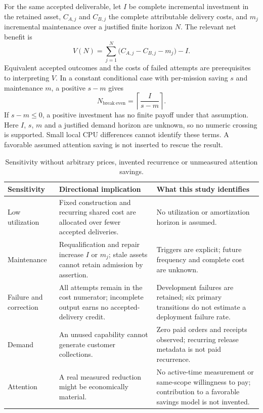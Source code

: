 \documentclass[11pt,a4paper]{article}
\begin{document}
For the same accepted deliverable, let $I$ be complete incremental investment in the retained asset, $C_{A,j}$ and $C_{B,j}$ the complete attributable delivery costs, and $m_j$ incremental maintenance over a justified finite horizon $N$. The relevant net benefit is
\begin{equation}
V(N)=\sum_{j=1}^{N}\bigl(C_{A,j}-C_{B,j}-m_j\bigr)-I.
\label{eq:payback}
\end{equation}
Equivalent accepted outcomes and the costs of failed attempts are prerequisites to interpreting $V$. In a constant conditional case with per-mission saving $s$ and maintenance $m$, a positive $s-m$ gives
\begin{equation}
N_{\mathrm{break\ even}}=\left\lceil\frac{I}{s-m}\right\rceil.
\end{equation}
If $s-m\leq0$, a positive investment has no finite payoff under that assumption. Here $I$, $s$, $m$ and a justified demand horizon are unknown, so no numeric crossing is supported. Small local CPU differences cannot identify these terms. A favorable assumed attention saving is not inserted to rescue the result.\cite{economics}

\begin{table}[htbp]
\centering\small
\begin{tabularx}{\textwidth}{@{}p{}YY@{}}
\toprule
Sensitivity & Directional implication & What this study identifies \\
\midrule
Low utilization & Fixed construction and recurring shared cost are allocated over fewer accepted deliveries. & No utilization or amortization horizon is assumed. \\
Maintenance & Requalification and repair increase $I$ or $m_j$; stale assets cannot retain admission by assertion. & Triggers are explicit; future frequency and complete cost are unknown. \\
Failure and correction & All attempts remain in the cost numerator; incomplete output earns no accepted-delivery credit. & Development failures are retained; six primary transitions do not estimate a deployment failure rate. \\
Demand & An unused capability cannot generate customer collections. & Zero paid orders and receipts observed; recurring release metadata is not paid recurrence. \\
Attention & A real measured reduction might be economically material. & No active-time measurement or same-scope willingness to pay; contribution to a favorable savings model is not invented. \\
\bottomrule
\end{tabularx}
\caption{Sensitivity without arbitrary prices, invented recurrence or unmeasured attention savings.}
\end{table}
\end{document}
